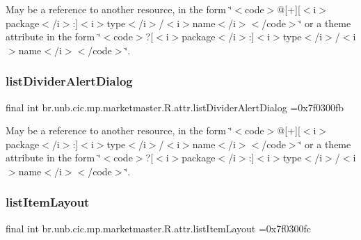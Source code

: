 May be a reference to another resource, in the form \char`\"{}$<$code$>$@\mbox{[}+\mbox{]}\mbox{[}$<$i$>$package$<$/i$>$\+:\mbox{]}$<$i$>$type$<$/i$>$/$<$i$>$name$<$/i$>$$<$/code$>$\char`\"{} or a theme attribute in the form \char`\"{}$<$code$>$?\mbox{[}$<$i$>$package$<$/i$>$\+:\mbox{]}$<$i$>$type$<$/i$>$/$<$i$>$name$<$/i$>$$<$/code$>$\char`\"{}. \mbox{\label{classbr_1_1unb_1_1cic_1_1mp_1_1marketmaster_1_1R_1_1attr_af9a6e4ccf68d03b1643aeb255e7ae85c}} 
\subsubsection{\texorpdfstring{list\+Divider\+Alert\+Dialog}{listDividerAlertDialog}}
{\footnotesize\ttfamily final int br.\+unb.\+cic.\+mp.\+marketmaster.\+R.\+attr.\+list\+Divider\+Alert\+Dialog =0x7f0300fb\hspace{0.3cm}{\ttfamily [static]}}

May be a reference to another resource, in the form \char`\"{}$<$code$>$@\mbox{[}+\mbox{]}\mbox{[}$<$i$>$package$<$/i$>$\+:\mbox{]}$<$i$>$type$<$/i$>$/$<$i$>$name$<$/i$>$$<$/code$>$\char`\"{} or a theme attribute in the form \char`\"{}$<$code$>$?\mbox{[}$<$i$>$package$<$/i$>$\+:\mbox{]}$<$i$>$type$<$/i$>$/$<$i$>$name$<$/i$>$$<$/code$>$\char`\"{}. \mbox{\label{classbr_1_1unb_1_1cic_1_1mp_1_1marketmaster_1_1R_1_1attr_af9dcdd96e53e5b237d71ec4095ca203f}} 
\subsubsection{\texorpdfstring{list\+Item\+Layout}{listItemLayout}}
{\footnotesize\ttfamily final int br.\+unb.\+cic.\+mp.\+marketmaster.\+R.\+attr.\+list\+Item\+Layout =0x7f0300fc\hspace{0.3cm}{\ttfamily [static]}}

